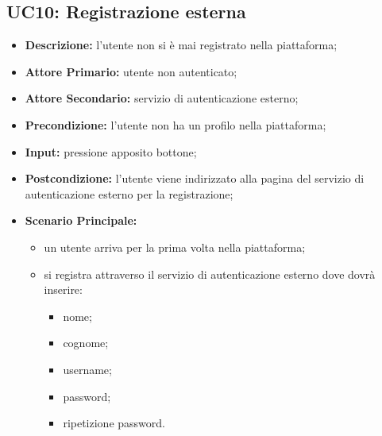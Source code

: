 \subsection{UC10: Registrazione esterna}
\label{sec:UC10}
\begin{itemize}
    \item \textbf{Descrizione:} l'utente non si è mai registrato nella piattaforma;
    \item \textbf{Attore Primario:} utente non autenticato;
    \item \textbf{Attore Secondario:} servizio di autenticazione esterno;
    \item \textbf{Precondizione:} l'utente non ha un profilo nella piattaforma;
    \item \textbf{Input:} pressione apposito bottone;
    \item \textbf{Postcondizione:} l'utente viene indirizzato alla pagina del servizio di autenticazione esterno per la registrazione;
    \item \textbf{Scenario Principale:}
          \begin{itemize}
              \item un utente arriva per la prima volta nella piattaforma;
              \item si registra attraverso il servizio di autenticazione esterno dove dovrà inserire:
                    \begin{itemize}
                        \item nome;
                        \item cognome;
                        \item username;
                        \item password;
                        \item ripetizione password.
                    \end{itemize}
          \end{itemize}
\end{itemize}